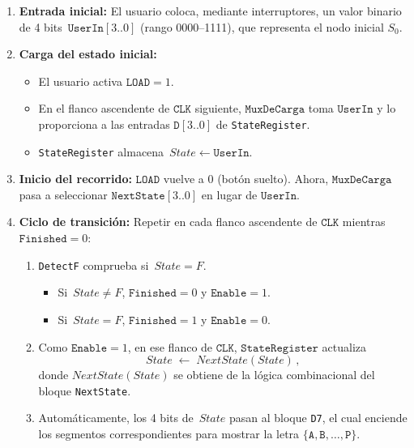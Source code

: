 \documentclass[12pt]{article}
\begin{document}
\begin{enumerate}
  \item \textbf{Entrada inicial:}  
        El usuario coloca, mediante interruptores, un valor binario de 4 bits 
        \(\,\texttt{UserIn}[3..0]\) (rango 0000–1111), que representa el nodo inicial \(S_{0}\).  
        
  \item \textbf{Carga del estado inicial:}  
        \begin{itemize}
          \item El usuario activa \(\texttt{LOAD} = 1\).  
          \item En el flanco ascendente de \(\texttt{CLK}\) siguiente, \(\texttt{MuxDeCarga}\) toma 
                \(\texttt{UserIn}\) y lo proporciona a las entradas \(\texttt{D}[3..0]\) de 
                \texttt{StateRegister}.  
          \item \texttt{StateRegister} almacena \(\,State \leftarrow \texttt{UserIn}\).  
        \end{itemize}

  \item \textbf{Inicio del recorrido:}  
        \(\texttt{LOAD}\) vuelve a 0 (botón suelto). Ahora, \(\texttt{MuxDeCarga}\) pasa a seleccionar 
        \(\texttt{NextState}[3..0]\) en lugar de \(\texttt{UserIn}\).  
        
  \item \textbf{Ciclo de transición:}  
        Repetir en cada flanco ascendente de \(\texttt{CLK}\) mientras \(\texttt{Finished} = 0\):  
        \begin{enumerate}
          \item \texttt{DetectF} comprueba si \(\,State = F\).  
            \begin{itemize}
              \item Si \(\,State \neq F\), \(\texttt{Finished} = 0\) y \(\texttt{Enable} = 1\).  
              \item Si \(\,State = F\), \(\texttt{Finished} = 1\) y \(\texttt{Enable} = 0\).  
            \end{itemize}
          \item Como \(\texttt{Enable} = 1\), en ese flanco de \(\texttt{CLK}\),  
            \(\texttt{StateRegister}\) actualiza  
            \[
              State \;\leftarrow\; NextState(State)\,,
            \]
            donde \(NextState(State)\) se obtiene de la lógica combinacional del bloque 
            \texttt{NextState}.  
          \item Automáticamente, los 4 bits de \(\,State\) pasan al bloque \texttt{D7},  
            el cual enciende los segmentos correspondientes para mostrar la letra  
            \(\{\texttt{A},\texttt{B},\dots,\texttt{P}\}\).  
        \end{enumerate}


\end{enumerate}
\end{document}
